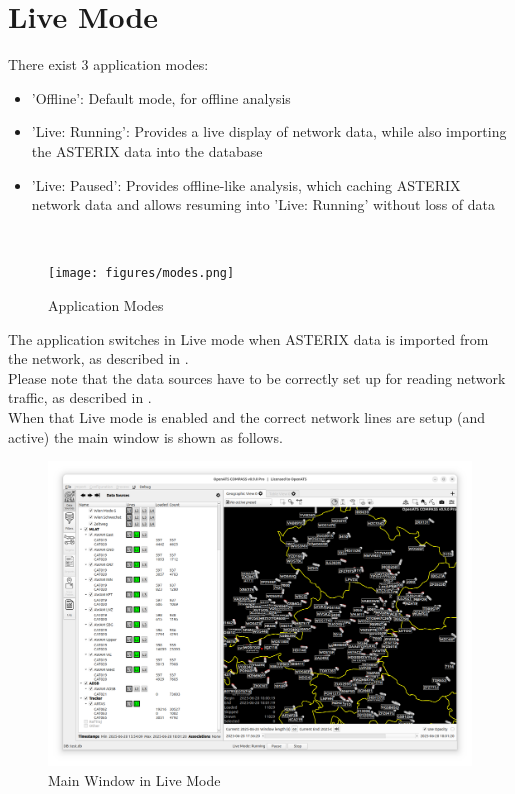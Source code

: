 \chapter{Live Mode}
\label{sec:live_mode}

There exist 3 application modes:
\begin{itemize}
\item 'Offline': Default mode, for offline analysis
\item 'Live: Running': Provides a live display of network data, while also importing the ASTERIX data into the database
\item 'Live: Paused': Provides offline-like analysis, which caching ASTERIX network data and allows resuming into 'Live: Running' without loss of data
\end{itemize}
\ \\

\begin{figure}[H]
 \center
    \texttt{[image: figures/modes.png]}
  \caption{Application Modes}
\end{figure}


The application switches in Live mode when ASTERIX data is imported from the network, as described in . \\

Please note that the data sources have to be correctly set up for reading network traffic, as described in . \\

When that Live mode is enabled and the correct network lines are setup (and active) the main window is shown as follows. 

\begin{figure}[H]
  \hspace*{-2.5cm}
    \includegraphics[width=19cm]{figures/live_mode.png}
  \caption{Main Window in Live Mode}
\end{figure}

